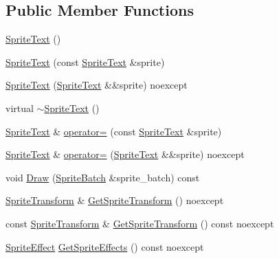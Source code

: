 \subsection*{Public Member Functions}
\begin{DoxyCompactItemize}
\item 
\mbox{\hyperlink{classmage_1_1rendering_1_1_sprite_text_aa250ee1527cbb9dba2f693df7cedd06f}{Sprite\+Text}} ()
\item 
\mbox{\hyperlink{classmage_1_1rendering_1_1_sprite_text_a60b40732c1a08b88b70335cf91947556}{Sprite\+Text}} (const \mbox{\hyperlink{classmage_1_1rendering_1_1_sprite_text}{Sprite\+Text}} \&sprite)
\item 
\mbox{\hyperlink{classmage_1_1rendering_1_1_sprite_text_ad2bdddde8371d59c85449a9979017f8c}{Sprite\+Text}} (\mbox{\hyperlink{classmage_1_1rendering_1_1_sprite_text}{Sprite\+Text}} \&\&sprite) noexcept
\item 
virtual \mbox{\hyperlink{classmage_1_1rendering_1_1_sprite_text_a6ce8013356e64827767178e01cc2737c}{$\sim$\+Sprite\+Text}} ()
\item 
\mbox{\hyperlink{classmage_1_1rendering_1_1_sprite_text}{Sprite\+Text}} \& \mbox{\hyperlink{classmage_1_1rendering_1_1_sprite_text_a50d21c24a019c0e8dc053a307ec421a6}{operator=}} (const \mbox{\hyperlink{classmage_1_1rendering_1_1_sprite_text}{Sprite\+Text}} \&sprite)
\item 
\mbox{\hyperlink{classmage_1_1rendering_1_1_sprite_text}{Sprite\+Text}} \& \mbox{\hyperlink{classmage_1_1rendering_1_1_sprite_text_a8ced44509f1fa84236b20f1d42add873}{operator=}} (\mbox{\hyperlink{classmage_1_1rendering_1_1_sprite_text}{Sprite\+Text}} \&\&sprite) noexcept
\item 
void \mbox{\hyperlink{classmage_1_1rendering_1_1_sprite_text_afbe374756e97dcec4fcf83f76a0c233b}{Draw}} (\mbox{\hyperlink{classmage_1_1rendering_1_1_sprite_batch}{Sprite\+Batch}} \&sprite\+\_\+batch) const
\item 
\mbox{\hyperlink{classmage_1_1_sprite_transform}{Sprite\+Transform}} \& \mbox{\hyperlink{classmage_1_1rendering_1_1_sprite_text_aab167f1dd0af96e05c34bb631d85e197}{Get\+Sprite\+Transform}} () noexcept
\item 
const \mbox{\hyperlink{classmage_1_1_sprite_transform}{Sprite\+Transform}} \& \mbox{\hyperlink{classmage_1_1rendering_1_1_sprite_text_a9b0bc8d9c8e123d49bd6cc9dcc35c06d}{Get\+Sprite\+Transform}} () const noexcept
\item 
\mbox{\hyperlink{namespacemage_1_1rendering_a4dbc3536c87b906f1d41d863ec458e78}{Sprite\+Effect}} \mbox{\hyperlink{classmage_1_1rendering_1_1_sprite_text_ad9a7ac6ba55ae87a1849b3f1e8e6892b}{Get\+Sprite\+Effects}} () const noexcept

\end{DoxyCompactItemize}

